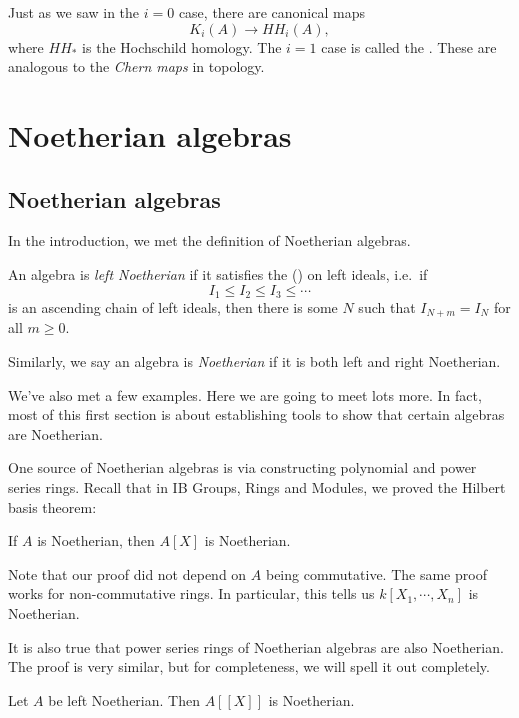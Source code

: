 \documentclass[a4paper]{article}
\newcommand\HH{H\!H}
\begin{document}
Just as we saw in the $i = 0$ case, there are canonical maps
\[
  K_i(A) \to \HH_i(A),
\]
where $\HH_*$ is the Hochschild homology. The $i = 1$ case is called the . These are analogous to the \emph{Chern maps} in topology.

\section{Noetherian algebras}
\subsection{Noetherian algebras}
In the introduction, we met the definition of Noetherian algebras.
\begin{defi}
  An algebra is \emph{left Noetherian} if it satisfies the  () on left ideals, i.e.\ if
  \[
    I_1 \leq I_2 \leq I_3 \leq \cdots
  \]
  is an ascending chain of left ideals, then there is some $N$ such that $I_{N + m} = I_N$ for all $m \geq 0$.

  Similarly, we say an algebra is \emph{Noetherian} if it is both left and right Noetherian.
\end{defi}
We've also met a few examples. Here we are going to meet lots more. In fact, most of this first section is about establishing tools to show that certain algebras are Noetherian.

One source of Noetherian algebras is via constructing polynomial and power series rings. Recall that in IB Groups, Rings and Modules, we proved the Hilbert basis theorem:
\begin{thm}
  If $A$ is Noetherian, then $A[X]$ is Noetherian.
\end{thm}
Note that our proof did not depend on $A$ being commutative. The same proof works for non-commutative rings. In particular, this tells us $k[X_1, \cdots, X_n]$ is Noetherian.

It is also true that power series rings of Noetherian algebras are also Noetherian. The proof is very similar, but for completeness, we will spell it out completely.
\begin{thm}
  Let $A$ be left Noetherian. Then $A[[X]]$ is Noetherian.
\end{thm}
\end{document}
